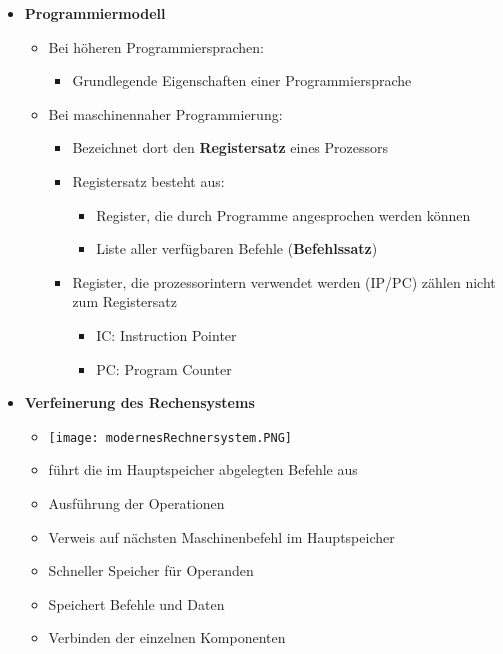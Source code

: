 \begin{itemize}
        \item \textbf{Programmiermodell}
            \begin{itemize}
                \item Bei höheren Programmiersprachen:
                    \begin{itemize}
                        \item Grundlegende Eigenschaften einer Programmiersprache 
                    \end{itemize} 
                \item Bei maschinennaher Programmierung:
                    \begin{itemize}
                        \item Bezeichnet dort den \textbf{Registersatz} eines Prozessors 
                        \item Registersatz besteht aus:
                            \begin{itemize}
                                \item Register, die durch Programme angesprochen werden können
                                \item Liste aller verfügbaren Befehle (\textbf{Befehlssatz})
                            \end{itemize}
                        \item Register, die prozessorintern verwendet werden (IP/PC) zählen nicht zum Registersatz
                            \begin{itemize}
                                \item IC: Instruction Pointer 
                                \item PC: Program Counter
                            \end{itemize}
                    \end{itemize}
            \end{itemize}

        \item \textbf{Verfeinerung des Rechensystems}
            \begin{itemize}
                \item[] \texttt{[image: modernesRechnersystem.PNG]}
                \item {} führt die im Hauptspeicher abgelegten Befehle aus 
                \item {} Ausführung der Operationen
                \item {} Verweis auf nächsten Maschinenbefehl im Hauptspeicher
                \item {} Schneller Speicher für Operanden
                \item {} Speichert Befehle und Daten 
                \item {} Verbinden der einzelnen Komponenten
            \end{itemize}


\end{itemize}
